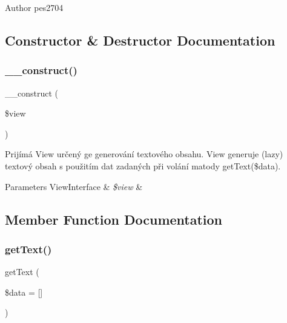 \begin{DoxyAuthor}{Author}
pes2704 
\end{DoxyAuthor}


\subsection{Constructor \& Destructor Documentation}
\mbox{\label{class_pes_1_1_dom_1_1_node_1_1_text_1_1_text_view_a37f379cfd1340ce50b22a4c8e4b68a83}} 
\subsubsection{\texorpdfstring{\+\_\+\+\_\+construct()}{\_\_construct()}}
{\footnotesize\ttfamily \+\_\+\+\_\+construct (\begin{DoxyParamCaption}\item[{\mbox{\hyperlink{interface_pes_1_1_view_1_1_view_interface}{View\+Interface}}}]{\$view }\end{DoxyParamCaption})}

Prijímá View určený ge generování textového obsahu. View generuje (lazy) textový obsah s použitím dat zadaných při volání matody get\+Text(\$data).


\begin{DoxyParams}[1]{Parameters}
View\+Interface & {\em \$view} & \\
\hline
\end{DoxyParams}


\subsection{Member Function Documentation}
\mbox{\label{class_pes_1_1_dom_1_1_node_1_1_text_1_1_text_view_a7897d55e6d6983b1f2cfa7214eaed267}} 
\subsubsection{\texorpdfstring{get\+Text()}{getText()}}
{\footnotesize\ttfamily get\+Text (\begin{DoxyParamCaption}\item[{}]{\$data = {\ttfamily \mbox{[}\mbox{]}} }\end{DoxyParamCaption})}

